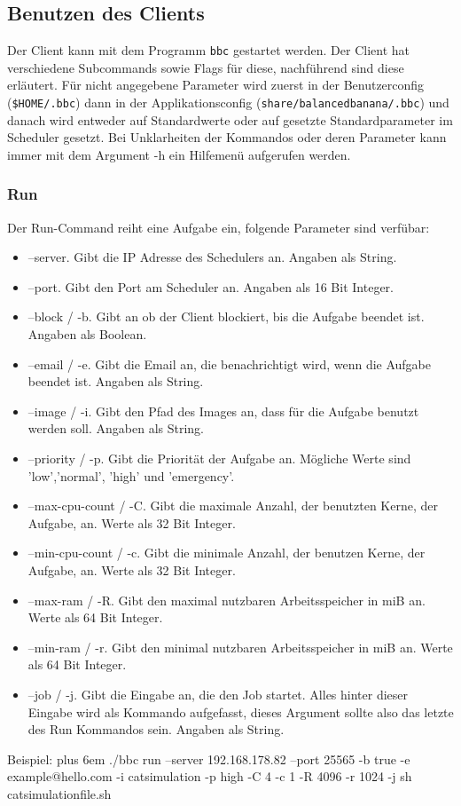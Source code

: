 \documentclass[a4paper,12pt]{article}
\makeatletter
\newenvironment{mycode}
 {\def\@xobeysp{\ }\verbatim\rightskip=0pt plus 6em\relax}
 {\endverbatim}
\makeatother
\begin{document}
\subsection{Benutzen des Clients}
Der Client kann mit dem Programm \texttt{bbc} gestartet werden. Der Client hat verschiedene Subcommands sowie Flags für diese, nachführend sind diese erläutert. Für nicht angegebene Parameter wird zuerst in der Benutzerconfig (\texttt{\$HOME/.bbc}) dann in der Applikationsconfig (\texttt{share/balancedbanana/.bbc}) und danach wird entweder auf Standardwerte oder auf gesetzte Standardparameter im Scheduler gesetzt.
Bei Unklarheiten der Kommandos oder deren Parameter kann immer mit dem Argument -h ein Hilfemenü aufgerufen werden.
\subsubsection{Run}
Der Run-Command reiht eine Aufgabe ein, folgende Parameter sind verfübar:
\begin{itemize}
\item --server. Gibt die IP Adresse des Schedulers an. Angaben als String.
\item --port. Gibt den Port am Scheduler an. Angaben als 16 Bit Integer.	
\item --block / -b. Gibt an ob der Client blockiert, bis die Aufgabe beendet ist. Angaben als Boolean.
\item --email / -e. Gibt die Email an, die benachrichtigt wird, wenn die Aufgabe beendet ist. Angaben als String.
\item --image / -i. Gibt den Pfad des Images an, dass für die Aufgabe benutzt werden soll.  Angaben als String.
\item --priority / -p. Gibt die Priorität der Aufgabe an. Mögliche Werte sind 'low','normal', 'high' und 'emergency'.
\item --max-cpu-count / -C. Gibt die maximale Anzahl, der benutzten Kerne, der Aufgabe, an. Werte als 32 Bit Integer.
\item --min-cpu-count / -c. Gibt die minimale Anzahl, der benutzen Kerne, der Aufgabe, an. Werte als 32 Bit Integer.
\item --max-ram / -R. Gibt den maximal nutzbaren Arbeitsspeicher in miB an. Werte als 64 Bit Integer.
\item --min-ram / -r. Gibt den minimal nutzbaren Arbeitsspeicher in miB an. Werte als 64 Bit Integer.
\item --job / -j. Gibt die Eingabe an, die den Job startet. Alles hinter dieser Eingabe wird als Kommando aufgefasst, dieses Argument sollte also das letzte des Run Kommandos sein. Angaben als String.
\end{itemize}
Beispiel: \newline
\begin{mycode}
	./bbc run --server 192.168.178.82 --port 25565 -b true -e example@hello.com -i catsimulation -p high -C 4 -c 1 -R 4096 -r 1024 -j sh catsimulationfile.sh
\end{mycode}
\end{document}
